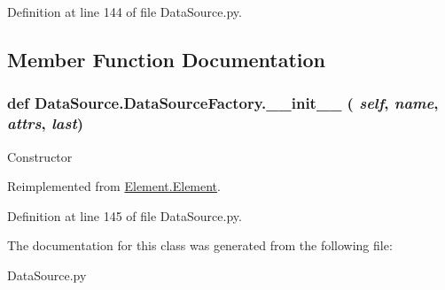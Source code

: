 Definition at line 144 of file DataSource.py.

\subsection{Member Function Documentation}
\hypertarget{classDataSource_1_1DataSourceFactory_a9cfa373f259e0f9b21c9f1624fb7b517}{
\subsubsection[{\_\-\_\-init\_\-\_\-}]{\setlength{\rightskip}{0pt plus 5cm}def DataSource.DataSourceFactory.\_\-\_\-init\_\-\_\- ( {\em self}, \/   {\em name}, \/   {\em attrs}, \/   {\em last})}}
\label{classDataSource_1_1DataSourceFactory_a9cfa373f259e0f9b21c9f1624fb7b517}
\begin{DoxyVerb}Constructor \end{DoxyVerb}
 

Reimplemented from \hyperlink{classElement_1_1Element_a359371465b7c4d21611adec7e86c3b33}{Element.Element}.

Definition at line 145 of file DataSource.py.

The documentation for this class was generated from the following file:\begin{DoxyCompactItemize}
\item 
DataSource.py\end{DoxyCompactItemize}
